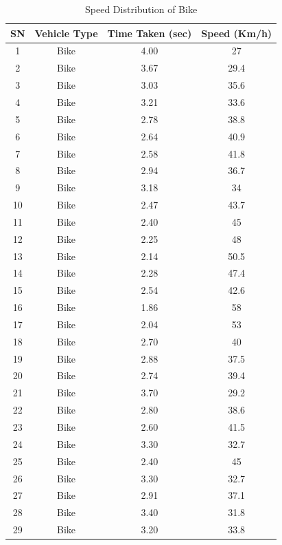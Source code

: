 \begin{table}[h!]
    \centering
    \caption{Speed Distribution of Bike}
    \begin{tabular}{|c|c|c|c|}
        \hline
        \textbf{SN}	& \textbf{Vehicle Type}	& \textbf{Time Taken (sec)}	& \textbf{Speed (Km/h)} \\ \hline
        1	&Bike	&4.00	&27 \\ \hline
        2	&Bike	&3.67	&29.4 \\ \hline
        3	&Bike	&3.03	&35.6 \\ \hline
        4	&Bike	&3.21	&33.6 \\ \hline
        5	&Bike	&2.78	&38.8 \\ \hline
        6	&Bike	&2.64	&40.9 \\ \hline
        7	&Bike	&2.58	&41.8 \\ \hline
        8	&Bike	&2.94	&36.7 \\ \hline
        9	&Bike	&3.18	&34 \\ \hline
        10	&Bike	&2.47	&43.7 \\ \hline
        11	&Bike	&2.40	&45 \\ \hline
        12	&Bike	&2.25	&48 \\ \hline
        13	&Bike	&2.14	&50.5 \\ \hline
        14	&Bike	&2.28	&47.4 \\ \hline
        15	&Bike	&2.54	&42.6 \\ \hline
        16	&Bike	&1.86	&58 \\ \hline
        17	&Bike	&2.04	&53 \\ \hline
        18	&Bike	&2.70	&40 \\ \hline
        19	&Bike	&2.88	&37.5 \\ \hline
        20	&Bike	&2.74	&39.4 \\ \hline
        21	&Bike	&3.70	&29.2 \\ \hline
        22	&Bike	&2.80	&38.6 \\ \hline
        23	&Bike	&2.60	&41.5 \\ \hline
        24	&Bike	&3.30	&32.7 \\ \hline
        25	&Bike	&2.40	&45 \\ \hline
        26	&Bike	&3.30	&32.7 \\ \hline
        27	&Bike	&2.91	&37.1 \\ \hline
        28	&Bike	&3.40	&31.8 \\ \hline
        29	&Bike	&3.20	&33.8 \\ \hline

\end{tabular}
\end{table}
